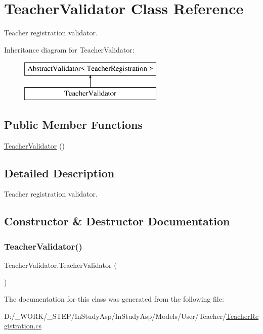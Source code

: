 \hypertarget{class_teacher_validator}{}\section{Teacher\+Validator Class Reference}
\label{class_teacher_validator}


Teacher registration validator.  


Inheritance diagram for Teacher\+Validator\+:\begin{figure}[H]
\begin{center}
\leavevmode
\includegraphics[height=2.000000cm]{class_teacher_validator}
\end{center}
\end{figure}
\subsection*{Public Member Functions}
\begin{DoxyCompactItemize}
\item 
\hyperlink{class_teacher_validator_a162804c2df0ecfa8d24679af271fad76}{Teacher\+Validator} ()
\end{DoxyCompactItemize}


\subsection{Detailed Description}
Teacher registration validator. 

\subsection{Constructor \& Destructor Documentation}
\mbox{\label{class_teacher_validator_a162804c2df0ecfa8d24679af271fad76}} 
\subsubsection{\texorpdfstring{Teacher\+Validator()}{TeacherValidator()}}
{\footnotesize\ttfamily Teacher\+Validator.\+Teacher\+Validator (\begin{DoxyParamCaption}{ }\end{DoxyParamCaption})}



The documentation for this class was generated from the following file\+:\begin{DoxyCompactItemize}
\item 
D\+:/\+\_\+\+W\+O\+R\+K/\+\_\+\+S\+T\+E\+P/\+In\+Study\+Asp/\+In\+Study\+Asp/\+Models/\+User/\+Teacher/\hyperlink{_teacher_registration_8cs}{Teacher\+Registration.\+cs}\end{DoxyCompactItemize}
